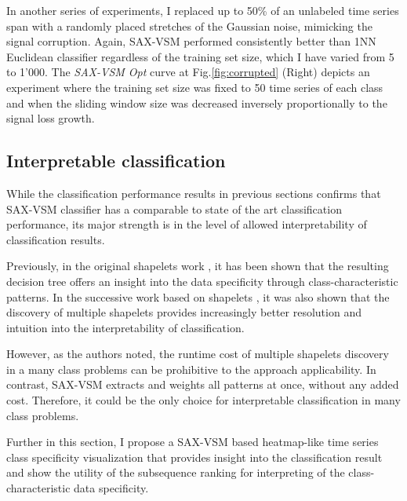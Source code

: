 In another series of experiments, I replaced up to 50\% of an unlabeled time series span with a randomly placed 
stretches of the Gaussian noise, mimicking the signal corruption. 
Again, SAX-VSM performed consistently better than 1NN Euclidean classifier regardless of the training set size, 
which I have varied from 5 to 1'000. 
The \textit{SAX-VSM Opt} curve at Fig.\ref{fig:corrupted} (Right) depicts an experiment where the training set size
was fixed to 50 time series of each class and when the sliding window size was decreased inversely proportionally 
to the signal loss growth.

\subsection{Interpretable classification}
While the classification performance results in previous sections confirms that SAX-VSM 
classifier has a comparable to state of the art classification performance, 
its major strength is in the level of allowed interpretability of classification results. 

Previously, in the original shapelets work \cite{citeulike:7344347, citeulike:11957982}, it has been shown 
that the resulting decision tree offers an insight into the data specificity through class-characteristic patterns.
In the successive work based on shapelets \cite{citeulike:11345338}, it was also shown that the 
discovery of multiple shapelets provides increasingly better resolution and intuition into the interpretability 
of classification. 

However, as the authors noted, the runtime cost of multiple shapelets discovery in a many class problems 
can be prohibitive to the approach applicability. In contrast, SAX-VSM extracts and weights all patterns at once, 
without any added cost. Therefore, it could be the only choice for interpretable classification in many class problems.

Further in this section, I propose a SAX-VSM based heatmap-like time series class specificity visualization 
that provides insight into the classification result and show the utility of the subsequence ranking for 
interpreting of the class-characteristic data specificity.

